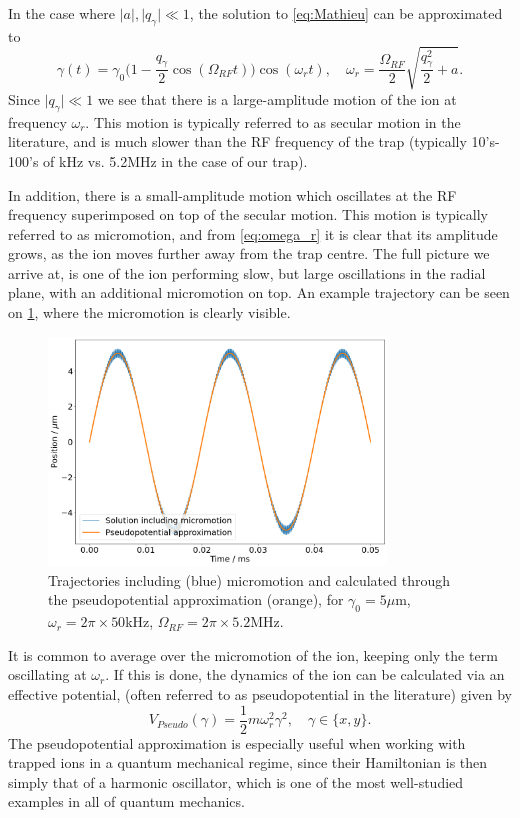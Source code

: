 In the case where $\vert a\vert,\vert q_\gamma\vert\ll 1$, the solution to \cref{eq:Mathieu} can be approximated to
\begin{equation}
    \label{eq:omega_r}
    \gamma(t) = \gamma_0\bigg(1-\frac{q_\gamma}{2}\cos{(\Omega_{RF}t)}\bigg)\cos{(\omega_r t)},\quad \omega_r = \frac{\Omega_{RF}}{2}\sqrt{\frac{q_\gamma^2}{2}+a}.
\end{equation}
Since $\vert q_\gamma\vert\ll 1$ we see that there is a large-amplitude motion of the ion at frequency $\omega_r$. This motion is typically referred to as secular motion in the literature, and is much slower than the RF frequency of the trap (typically 10's-100's of kHz vs. 5.2MHz in the case of our trap). 

In addition, there is a small-amplitude motion which oscillates at the RF frequency superimposed on top of the secular motion. This motion is typically referred to as micromotion, and from \cref{eq:omega_r} it is clear that its amplitude grows, as the ion moves further away from the trap centre. The full picture we arrive at, is one of the ion performing slow, but large oscillations in the radial plane, with an additional micromotion on top. An example trajectory can be seen on \cref{fig:micromotion}, where the micromotion is clearly visible.



\begin{figure}
    \centering
    \includegraphics[width = 0.8\textwidth]{main/Micromotion.png}
    \caption{Trajectories including (blue) micromotion and calculated through the pseudopotential approximation (orange), for $\gamma_0 = 5 {\mu}$m, $\omega_r = 2\pi\times 50$kHz, $\Omega_{RF} = 2\pi\times 5.2$MHz.}
    \label{fig:micromotion}
\end{figure}

It is common to average over the micromotion of the ion, keeping only the term oscillating at $\omega_r$. If this is done, the dynamics of the ion can be calculated via an effective potential, (often referred to as pseudopotential in the literature) given by
\begin{equation}
    V_{Pseudo}(\gamma) = \frac{1}{2}m\omega_r^2\gamma^2,\quad \gamma\in\{x,y\}.
\end{equation}
The pseudopotential approximation is especially useful when working with trapped ions in a quantum mechanical regime, since their Hamiltonian is then simply that of a harmonic oscillator, which is one of the most well-studied examples in all of quantum mechanics.
